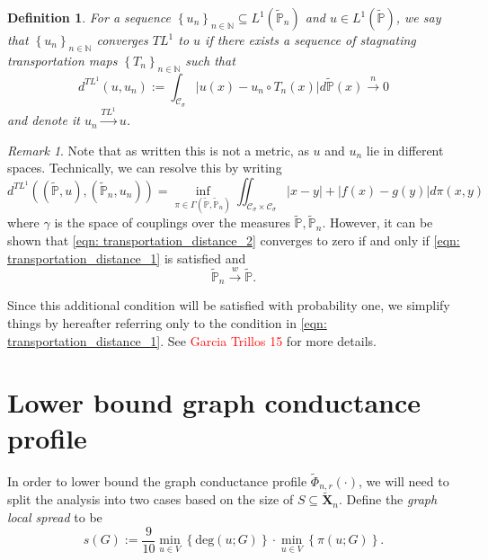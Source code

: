 \documentclass{article}
\newcommand{\abs}[1]{\left \lvert #1 \right \rvert}
\newcommand{\set}[1]{\left\{#1\right\}}
\newcommand{\seq}[1]{\set{#1}_{n \in \N}}
\newcommand{\N}{\mathbb{N}}
\newcommand{\Xbf}{\mathbf{X}}
\newcommand{\Cset}{\mathcal{C}}
\newcommand{\Csig}{\Cset_{\sigma}}
\newcommand{\Pbb}{\mathbb{P}}
\newcommand{\1}{\mathbf{1}}
\theoremstyle{alden}
\newtheorem{definition}{Definition}[section]
\theoremstyle{aldenthm}
\theoremstyle{remark}
\newtheorem{remark}{Remark}
\begin{document}
\begin{definition}
	For a sequence $\seq{u_n} \subseteq L^1(\widetilde{\Pbb}_n)$ and $u \in L^1(\widetilde{\Pbb})$, we say that $\seq{u_n}$ converges $TL^1$ to $u$ if there exists a sequence of stagnating transportation maps $\seq{T_n}$ such that
	\begin{equation}
	\label{eqn: transportation_distance_1}
	d^{TL^1}(u,u_n) := \int_{\Csig} \abs{u(x) - u_n \circ T_n(x)} d \widetilde{\Pbb}(x) \overset{n}{\to} 0 
	\end{equation}
	and denote it $u_n \overset{TL^1}{\to} u$.
\end{definition}

\begin{remark}
	\label{rmk: transportation_distance_equivalence}
	Note that as written this is not a metric, as $u$ and $u_n$ lie in different spaces. Technically, we can resolve this by writing
	\begin{equation}
	\label{eqn: transportation_distance_2}
	d^{TL^1}((\widetilde{\Pbb}, u),(\widetilde{\Pbb}_n,u_n)) = \inf_{\pi \in \Gamma(\widetilde{\Pbb},\widetilde{\Pbb}_n)} \iint_{\Csig \times \Csig} \abs{x - y} + \abs{f(x) - g(y)} d\pi(x,y)
	\end{equation}
	where $\gamma$ is the space of couplings over the measures $\widetilde{\Pbb}, \widetilde{\Pbb}_n$. However, it can be shown that \eqref{eqn: transportation_distance_2} converges to zero if and only if \eqref{eqn: transportation_distance_1} is satisfied and 
	\begin{equation*}
	\widetilde{\Pbb}_n \overset{w}{\to} \widetilde{\Pbb}.
	\end{equation*}
	
	Since this additional condition will be satisfied with probability one, we simplify things by hereafter referring only to the condition in \eqref{eqn: transportation_distance_1}. See \textcolor{red}{Garcia Trillos 15} for more details.
\end{remark}

\section{Lower bound graph conductance profile}

In order to lower bound the graph conductance profile $\widetilde{\Phi}_{n,r}(\cdot)$, we will need to split the analysis into two cases based on the size of $S \subseteq \widetilde{\Xbf}_n$. Define the \emph{graph local spread} to be
\begin{equation*}
s(G) := \frac{9}{10} \min_{u \in V} \set{\mathrm{deg}(u;G)} \cdot \min_{u \in V} \set{\pi(u;G)}.  \tag{$G = (V,E)$}
\end{equation*} 
\end{document}
